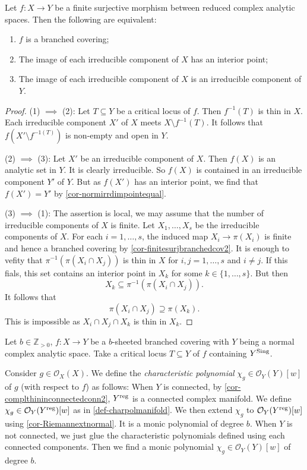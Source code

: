 \begin{corollary}\label{cor-branchedcovcondition}
    Let $f:X\rightarrow Y$ be a finite surjective morphism between reduced complex analytic spaces. Then the following are equivalent:
    \begin{enumerate}
        \item $f$ is a branched covering;
        \item The image of each irreducible component of $X$ has an interior point;
        \item The image of each irreducible component of $X$ is an irreducible component of $Y$.
    \end{enumerate}
\end{corollary}
\begin{proof}
    (1) $\implies$ (2): Let $T\subseteq Y$ be a critical locus of $f$. Then $f^{-1}(T)$ is thin in $X$. Each irreducible component $X'$ of $X$ meets $X\setminus f^{-1}(T)$. It follows that $f(X'\setminus f^{-1(T)})$ is non-empty and open in $Y$.

    (2) $\implies$ (3): Let $X'$ be an irreducible component of $X$. Then $f(X)$ is an analytic set in $Y$. It is clearly irreducible. So $f(X)$ is contained in an irreducible component $Y'$ of $Y$. But as $f(X')$ has an interior point, we find that $f(X')=Y'$ by \cref{cor-normirrdimpointequal}.

    (3) $\implies$ (1): The assertion is local, we may assume that the number of irreducible components of $X$ is finite. Let $X_1,\ldots,X_s$ be the irreducible components of $X$.
    For each $i=1,\ldots,s$, the induced map $X_i\rightarrow \pi(X_i)$ is finite and hence a branched covering by \cref{cor-finitesurjbranchedcov2}. It is enough to vefity that $\pi^{-1}(\pi(X_i\cap X_j))$ is thin in $X$ for $i,j=1,\ldots,s$ and $i\neq j$. If this fials, this set contains an interior point in $X_k$ for some $k\in \{1,\ldots,s\}$. But then 
    \[
        X_k\subseteq \pi^{-1}(\pi(X_i\cap X_j)).  
    \]
    It follows that 
    \[
        \pi(X_i\cap X_j)\supseteq \pi(X_k).  
    \]
    This is impossible as $X_i\cap X_j\cap X_k$ is thin in $X_k$.
\end{proof}



\begin{definition}
    Let $b\in \mathbb{Z}_{>0}$, $f:X\rightarrow Y$ be a $b$-sheeted branched covering with $Y$ being a normal complex analytic space. Take a critical locus $T\subseteq Y$ of $f$ containing $Y^{\operatorname{Sing}}$. 
    
    Consider $g\in \mathcal{O}_X(X)$. We define the \emph{characteristic polynomial} $\chi_g\in \mathcal{O}_Y(Y)[w]$ of $g$ (with respect to $f$) as follows: When $Y$ is connected, by \cref{cor-complthininconnectedconn2}, $Y^{\operatorname{reg}}$ is a connected complex manifold. We define $\chi_g\in \mathcal{O}_Y(Y^{\operatorname{reg}})[w]$ as in \cref{def-charpolmanifold}. We then extend $\chi_g$ to $\mathcal{O}_Y(Y^{\operatorname{reg}})[w]$ using \cref{cor-Riemannextnormal}. It is a monic polynomial of degree $b$. When $Y$ is not connected, we just glue the characteristic polynomials defined using each connected components. Then we find a monic polynomial $\chi_g\in \mathcal{O}_Y(Y)[w]$ of degree $b$.
\end{definition}


